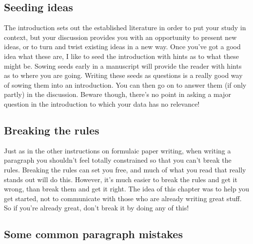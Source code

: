 \documentclass[
]{krantz}
\begin{document}
\hypertarget{seeding-ideas}{%
\subsection{Seeding ideas}\label{seeding-ideas}}

The introduction sets out the established literature in order to put your study in context, but your discussion provides you with an opportunity to present new ideas, or to turn and twist existing ideas in a new way. Once you've got a good idea what these are, I like to seed the introduction with hints as to what these might be. Sowing seeds early in a manuscript will provide the reader with hints as to where you are going. Writing these seeds as questions is a really good way of sowing them into an introduction. You can then go on to answer them (if only partly) in the discussion. Beware though, there's no point in asking a major question in the introduction to which your data has no relevance!

\hypertarget{breaking-the-rules}{%
\subsection{Breaking the rules}\label{breaking-the-rules}}

Just as in the other instructions on formulaic paper writing, when writing a paragraph you shouldn't feel totally constrained so that you can't break the rules. Breaking the rules can set you free, and much of what you read that really stands out will do this. However, it's much easier to break the rules and get it wrong, than break them and get it right. The idea of this chapter was to help you get started, not to communicate with those who are already writing great stuff. So if you're already great, don't break it by doing any of this!

\hypertarget{some-common-paragraph-mistakes}{%
\subsection{Some common paragraph mistakes}\label{some-common-paragraph-mistakes}}
\end{document}
